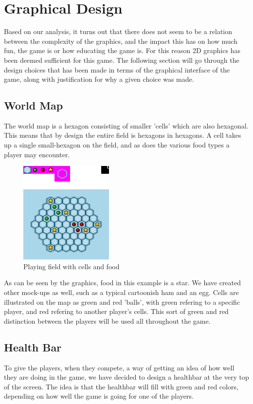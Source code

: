 \section{Graphical Design}

Based on our analysis, it turns out that there does not seem to be a relation between the complexity of the graphics, and the impact this has on how 
much fun, the game is or how educating the game is. For this reason 2D graphics has been deemed sufficient for this game. The following section will go 
through the design choices that has been made in terms of the graphical interface of the game, along with justification for why a given choice was made.

\subsection{World Map}

The world map is a hexagon consisting of smaller 'cells' which are also hexagonal. This means that by design the entire field is hexagons in hexagons. 
A cell takes up a single small-hexagon on the field, and as does the various food types a player may encounter.


\begin{figure}[h]
	\centering
		\includegraphics{img/cells_mockup.png}
	\caption{Playing field with cells and food}
	\label{fig:cells_mockup}
\end{figure}

As can be seen by the graphics, food in this example is a star. We have created other mock-ups as well, such as a typical cartoonish ham and an egg. 
Cells are illustrated on the map as green and red 'balls', with green refering to a specific player, and red refering to another player's cells. This 
sort of green and red distinction between the players will be used all throughout the game.


\subsection{Health Bar}

To give the players, when they compete, a way of getting an idea of how well they are doing in the game, we have decided to design a healthbar at the 
very top of the screen. The idea is that the healthbar will fill with green and red colors, depending on how well the game is going for one of the 
players.